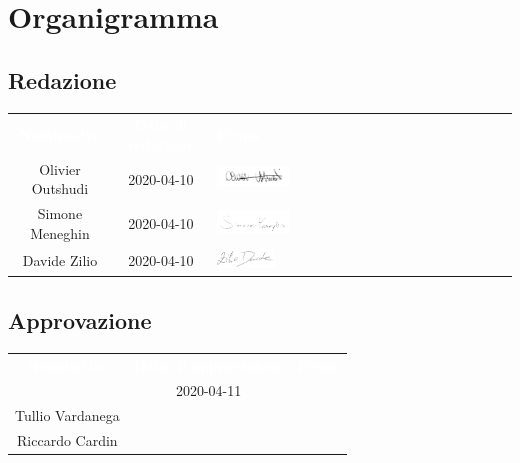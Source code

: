 \section{Organigramma}
\subsection{Redazione} 
\begin{table}[H]
	\begin{center}
	\begin{tabular}{ c c C{8cm} }
		\textcolor{white}{\textbf{Nominativo}} & \textcolor{white}{\textbf{Data di redazione}} & \textcolor{white}{\textbf{Firma}} \\
		Olivier Outshudi & 2020-04-10 & \includegraphics[scale=0.3, width=0.25\textwidth]{img/firme/outshudi.png}\\
		Simone Meneghin & 2020-04-10 & \includegraphics[scale=0.3, width=0.25\textwidth]{img/firme/meneghin.png}\\
		Davide Zilio & 2020-04-10 & \includegraphics[scale=0.2, width=0.2\textwidth]{img/firme/zilio.png}\\
	\end{tabular}
	\end{center}	
\end{table}

\subsection{Approvazione} 
\begin{table}[H]
	\begin{center}
	\begin{tabular}{ c c C{7.4cm} }
		\textcolor{white}{\textbf{Nominativo}} & \textcolor{white}{\textbf{Data di approvazione}} & \textcolor{white}{\textbf{Firma}} \\
		 & 2020-04-11 & \\
		Tullio Vardanega &  & \\
		Riccardo Cardin &  & \\
	\end{tabular}
	\end{center}	
\end{table}

